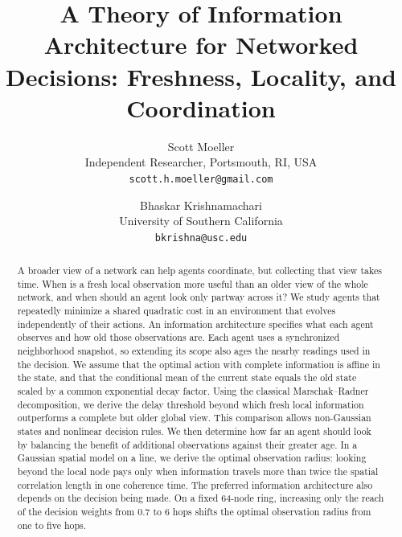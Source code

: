 \documentclass[11pt]{article}
\begin{document}
\title{A Theory of Information Architecture for Networked Decisions:
Freshness, Locality, and Coordination}
\author{
Scott Moeller\\
\small Independent Researcher, Portsmouth, RI, USA\\
\small \texttt{scott.h.moeller@gmail.com}
\and
Bhaskar Krishnamachari\\
\small University of Southern California\\
\small \texttt{bkrishna@usc.edu}
}

\date{}


\maketitle

\begin{abstract}
A broader view of a network can help agents coordinate, but collecting that view takes time. When is a fresh local observation more useful than an older view of the whole network, and when should an agent look only partway across it? We study agents that repeatedly minimize a shared quadratic cost in an environment that evolves independently of their actions. An information architecture specifies what each agent observes and how old those observations are. Each agent uses a synchronized neighborhood snapshot, so extending its scope also ages the nearby readings used in the decision. We assume that the optimal action with complete information is affine in the state, and that the conditional mean of the current state equals the old state scaled by a common exponential decay factor. Using the classical Marschak--Radner decomposition, we derive the delay threshold beyond which fresh local information outperforms a complete but older global view. This comparison allows non-Gaussian states and nonlinear decision rules. We then determine how far an agent should look by balancing the benefit of additional observations against their greater age. In a Gaussian spatial model on a line, we derive the optimal observation radius: looking beyond the local node pays only when information travels more than twice the spatial correlation length in one coherence time. The preferred information architecture also depends on the decision being made. On a fixed 64-node ring, increasing only the reach of the decision weights from 0.7 to 6 hops shifts the optimal observation radius from one to five hops.
\end{abstract}
\end{document}
